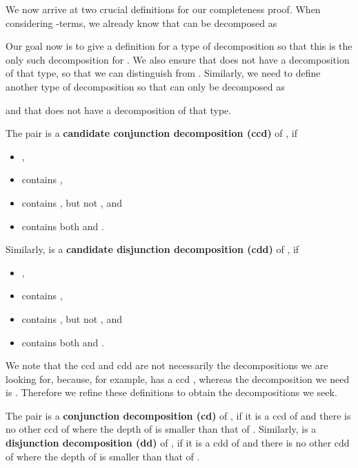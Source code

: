 We now arrive at two crucial definitions for our completeness proof. When
considering -terms, we already know that  can be
decomposed as

Our goal now is to give a definition for a type of decomposition so that this
is the only such decomposition for . We also ensure that
 does not have a decomposition of that type, so that we can
distinguish  from . Similarly, we need
to define another type of decomposition so that  can only be
decomposed as 

and that  does not have a decomposition of that type.

\begin{definition}
The pair  is a \textbf{candidate conjunction
decomposition (ccd)} of , if
\begin{itemize}
\item ,
\item  contains ,
\item  contains , but not , and
\item  contains both  and .
\end{itemize}
Similarly,  is a \textbf{candidate disjunction decomposition (cdd)} of
, if
\begin{itemize}
\item ,
\item  contains ,
\item  contains , but not , and
\item  contains both  and .
\end{itemize}
\end{definition}

We note that the ccd and cdd are not necessarily the decompositions we are
looking for, because, for example,  has a ccd
, whereas the decomposition we
need is . Therefore we refine
these definitions to obtain the decompositions we seek.

\begin{definition}
The pair  is a \textbf{conjunction decomposition
(cd)} of , if it is a ccd of  and there is no other ccd 
of  where the depth of  is smaller than that of . Similarly, 
is a \textbf{disjunction decomposition (dd)} of , if it is a cdd of  and
there is no other cdd  of  where the depth of  is smaller than
that of .
\end{definition}

